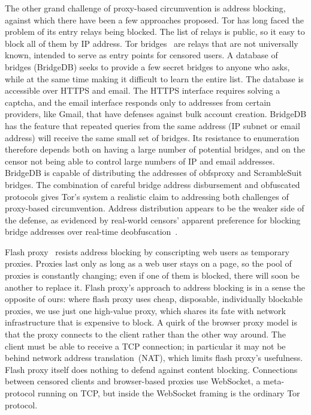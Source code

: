 \documentclass[conference]{IEEEtran}
\begin{document}
The other grand challenge of proxy-based circumvention is address blocking,
against which there have been a few approaches proposed.
Tor has long faced the problem of its entry relays being blocked. The list of
relays is public, so it easy to block all of them by IP address. Tor
bridges~\cite{tor-blocking} are relays that are not universally known, intended
to serve as entry points for censored users. A database of bridges (BridgeDB) seeks to
provide a few secret bridges to anyone who asks, while at the same time making it
difficult to learn the entire list.
The database is accessible over HTTPS and email.
The HTTPS interface requires solving a captcha,
and the email interface responds only to addresses from certain providers, like Gmail,
that have defenses against bulk account creation.
BridgeDB has the feature that repeated queries from the same address
(IP subnet or email address) will receive the same small set of bridges.
Its resistance to enumeration therefore depends both on
having a large number of potential bridges,
and on the censor not being able to control large numbers of IP and email addresses.
BridgeDB is capable of distributing
the addresses of obfsproxy and ScrambleSuit bridges.
The combination
of careful bridge address disbursement and obfuscated protocols
gives Tor's system a realistic claim to addressing both challenges of proxy-based circumvention.
Address distribution appears to be the weaker side of the defense,
as evidenced by real-world censors' apparent preference for
blocking bridge addresses over real-time deobfuscation~\cite{foci12-winter}.

Flash proxy~\cite{flashproxy} resists address blocking by
conscripting web users as temporary proxies. Proxies last only as long as a web
user stays on a page, so the pool of proxies is constantly changing;
even if one of them is blocked, there will soon be another to replace it.
Flash proxy's approach to address blocking is in a sense
the opposite of ours: where flash proxy uses cheap, disposable, individually blockable proxies,
we use just one high-value proxy, which shares its fate with network
infrastructure that is expensive to block.
A quirk of the browser proxy model is that the proxy connects to the client rather than the other way around.
The client must be able to receive a TCP connection; in particular it
may not be behind network address translation~(NAT), which limits flash proxy's usefulness.
Flash proxy itself does nothing to defend against content blocking.
Connections between censored clients and browser-based proxies use
WebSocket, a meta-protocol running on TCP,
but inside the WebSocket framing is the ordinary Tor protocol.
\end{document}
